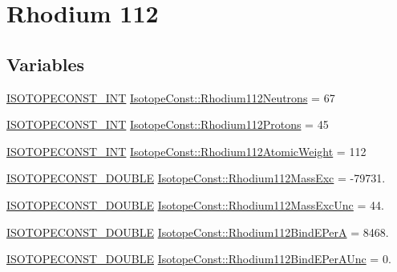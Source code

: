 \hypertarget{group___isotope_const-_rhodium-_rh112}{}\section{Rhodium 112}
\label{group___isotope_const-_rhodium-_rh112}
\subsection*{Variables}
\begin{DoxyCompactItemize}
\item 
\mbox{\hyperlink{group___isotope_const-_macros_ga5f18360b3e99483a35c32d789e62621c}{I\+S\+O\+T\+O\+P\+E\+C\+O\+N\+S\+T\+\_\+\+I\+NT}} \mbox{\hyperlink{group___isotope_const-_rhodium-_rh112_gad8a7bfcdfffb77ea4bcd04d64e7b4223}{Isotope\+Const\+::\+Rhodium112\+Neutrons}} = 67
\item 
\mbox{\hyperlink{group___isotope_const-_macros_ga5f18360b3e99483a35c32d789e62621c}{I\+S\+O\+T\+O\+P\+E\+C\+O\+N\+S\+T\+\_\+\+I\+NT}} \mbox{\hyperlink{group___isotope_const-_rhodium-_rh112_ga7af00fd8c3b238700227b809d31aafbb}{Isotope\+Const\+::\+Rhodium112\+Protons}} = 45
\item 
\mbox{\hyperlink{group___isotope_const-_macros_ga5f18360b3e99483a35c32d789e62621c}{I\+S\+O\+T\+O\+P\+E\+C\+O\+N\+S\+T\+\_\+\+I\+NT}} \mbox{\hyperlink{group___isotope_const-_rhodium-_rh112_gad28417c6fac84bf5767b92d97b66c7e8}{Isotope\+Const\+::\+Rhodium112\+Atomic\+Weight}} = 112
\item 
\mbox{\hyperlink{group___isotope_const-_macros_ga8f45a7272ce02c0b4c65c44636ed719a}{I\+S\+O\+T\+O\+P\+E\+C\+O\+N\+S\+T\+\_\+\+D\+O\+U\+B\+LE}} \mbox{\hyperlink{group___isotope_const-_rhodium-_rh112_ga89bf718d9dc745e9322f7d7adfa1b60e}{Isotope\+Const\+::\+Rhodium112\+Mass\+Exc}} = -\/79731.
\item 
\mbox{\hyperlink{group___isotope_const-_macros_ga8f45a7272ce02c0b4c65c44636ed719a}{I\+S\+O\+T\+O\+P\+E\+C\+O\+N\+S\+T\+\_\+\+D\+O\+U\+B\+LE}} \mbox{\hyperlink{group___isotope_const-_rhodium-_rh112_ga6e72b926899a13e22d7191913882ef4e}{Isotope\+Const\+::\+Rhodium112\+Mass\+Exc\+Unc}} = 44.
\item 
\mbox{\hyperlink{group___isotope_const-_macros_ga8f45a7272ce02c0b4c65c44636ed719a}{I\+S\+O\+T\+O\+P\+E\+C\+O\+N\+S\+T\+\_\+\+D\+O\+U\+B\+LE}} \mbox{\hyperlink{group___isotope_const-_rhodium-_rh112_gac17dc36f173957d5c4bf29dbcc76a26c}{Isotope\+Const\+::\+Rhodium112\+Bind\+E\+PerA}} = 8468.
\item 
\mbox{\hyperlink{group___isotope_const-_macros_ga8f45a7272ce02c0b4c65c44636ed719a}{I\+S\+O\+T\+O\+P\+E\+C\+O\+N\+S\+T\+\_\+\+D\+O\+U\+B\+LE}} \mbox{\hyperlink{group___isotope_const-_rhodium-_rh112_gad7264eeb162e57fa620f9808a6ccce0d}{Isotope\+Const\+::\+Rhodium112\+Bind\+E\+Per\+A\+Unc}} = 0.

\end{DoxyCompactItemize}
